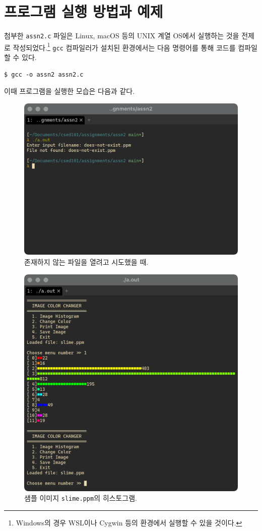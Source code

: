 \documentclass[titlepage]{article}
\begin{document}
\section{프로그램 실행 방법과 예제}

첨부한 \texttt{assn2.c} 파일은 Linux, macOS 등의 UNIX 계열 OS에서 실행하는 것을 전제로 작성되었다.\footnote{Windows의 경우 WSL이나 Cygwin 등의 환경에서 실행할 수 있을 것이다.} \texttt{gcc} 컴파일러가 설치된 환경에서는 다음 명령어를 통해 코드를 컴파일할 수 있다.

\begin{lstlisting}
$ gcc -o assn2 assn2.c
\end{lstlisting}

이때 프로그램을 실행한 모습은 다음과 같다.

\begin{figure}[H]
  \centering
  \includegraphics[width=0.7\linewidth]{file_check.png}
  \caption{존재하지 않는 파일을 열려고 시도했을 때.}
\end{figure}

\begin{figure}[H]
  \centering
  \includegraphics[width=0.7\linewidth]{histogram.png}
  \caption{샘플 이미지 \texttt{slime.ppm}의 히스토그램.}
\end{figure}
\end{document}
